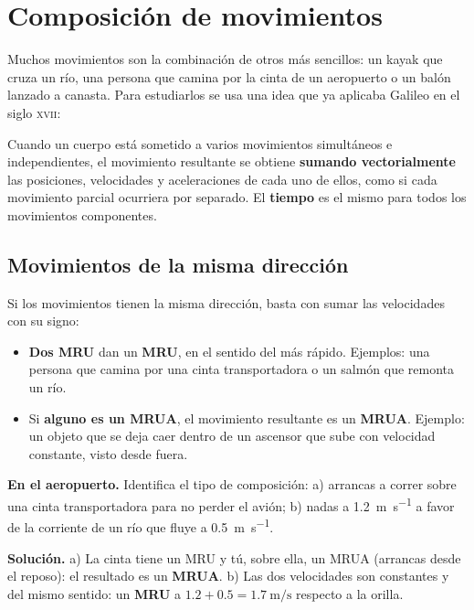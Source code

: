 \section{Composición de movimientos}\label{sec:ud9-composicion}

Muchos movimientos son la combinación de otros más sencillos: un kayak que cruza un río, una persona que camina por la cinta de un
aeropuerto o un balón lanzado a canasta. Para estudiarlos se usa una idea que ya aplicaba Galileo en el siglo \textsc{xvii}:

\begin{definition}
    Cuando un cuerpo está sometido a varios movimientos simultáneos e independientes, el movimiento resultante se obtiene
    \textbf{sumando vectorialmente} las posiciones, velocidades y aceleraciones de cada uno de ellos, como si cada movimiento parcial
    ocurriera por separado. El \textbf{tiempo} es el mismo para todos los movimientos componentes.
\end{definition}

\subsection{Movimientos de la misma dirección}

Si los movimientos tienen la misma dirección, basta con sumar las velocidades con su signo:
\begin{itemize}
    \item \textbf{Dos MRU} dan un \textbf{MRU}, en el sentido del más rápido. Ejemplos: una persona que camina por una cinta
    transportadora o un salmón que remonta un río.
    \item Si \textbf{alguno es un MRUA}, el movimiento resultante es un \textbf{MRUA}. Ejemplo: un objeto que se deja caer dentro de
    un ascensor que sube con velocidad constante, visto desde fuera.
\end{itemize}

\begin{example}
    \textbf{En el aeropuerto.} Identifica el tipo de composición: a) arrancas a correr sobre una cinta transportadora para no perder
    el avión; b) nadas a \qty{1.2}{\m\per\s} a favor de la corriente de un río que fluye a \qty{0.5}{\m\per\s}.

    \textbf{Solución.} a) La cinta tiene un MRU y tú, sobre ella, un MRUA (arrancas desde el reposo): el resultado es un
    \textbf{MRUA}. b) Las dos velocidades son constantes y del mismo sentido: un \textbf{MRU} a \(\num{1.2} + \num{0.5} =
    \qty{1.7}{\m\per\s}\) respecto a la orilla.
\end{example}

